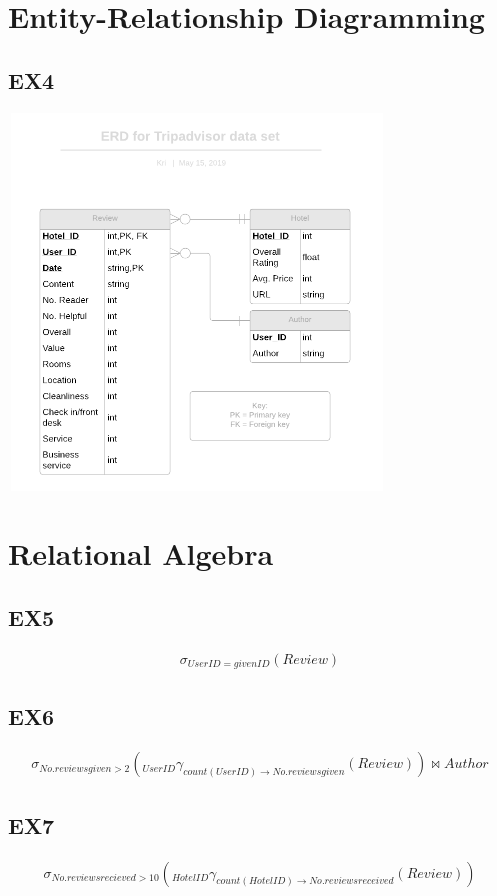 \documentclass{article}
\begin{document}
	\section{Entity-Relationship Diagramming}
	
	\subsection{EX4}
	\includegraphics[width=10cm, height=10cm]{EX4_ERD_Tripadvisor.png}
	
	
	\section{Relational Algebra}
	
	\subsection{EX5}
	\begin{eqnarray}
	\sigma_{User ID = given ID}(Review)
	\end{eqnarray}
		
	\subsection{EX6}
	\begin{eqnarray}
	\sigma _{No. reviews given > 2}(_{User ID} \gamma _{count(User ID) \rightarrow No. reviews given}(Review)) \bowtie Author
	\end{eqnarray}
	
	\subsection{EX7}
	\begin{eqnarray}
		\sigma _{No. reviews recieved > 10}(_{Hotel ID} \gamma _{count(Hotel ID) \rightarrow No. reviews received}(Review))
	\end{eqnarray}
	
\end{document}
